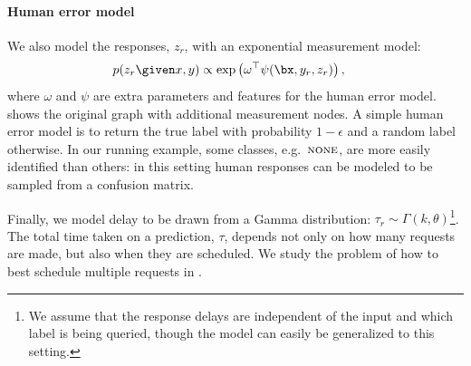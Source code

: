 
\paragraph{Human error model}
We also model the responses, $z_r$, with an exponential measurement model:
\begin{align*}
  p(z_r \given x, y) 
  &\propto \exp \left( \omega^\top\psi(\bx, y_r, z_r) \right),
\end{align*}
where $\omega$ and $\psi$ are extra parameters and features for the human error model. 
 shows the original graph with additional measurement nodes.
A simple human error model is to return the true label with probability $1-\epsilon$ and a random label otherwise.
In our running example, some classes, e.g.\ $\textsc{none}$, are more easily identified than others: in this setting human responses can be modeled to be sampled from a confusion matrix.

Finally, we model delay to be drawn from a Gamma distribution: $\tau_r \sim \Gamma(k, \theta)$\footnote{We assume that the response delays are independent of the input and which label is being queried, though the model can easily be generalized to this setting.}.
The total time taken on a prediction, $\tau$, depends not only on how many requests are made, but also when they are scheduled.
We study the problem of how to best schedule multiple requests in .




